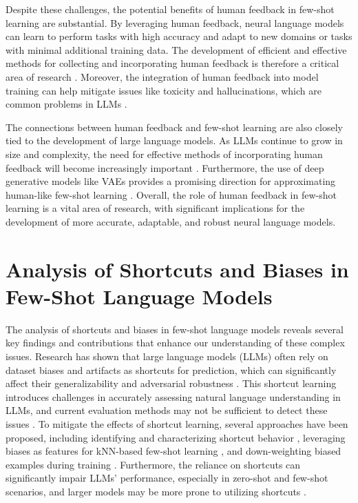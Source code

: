 \documentclass[conference]{IEEEtran}
\begin{document}
Despite these challenges, the potential benefits of human feedback in few-shot learning are substantial. By leveraging human feedback, neural language models can learn to perform tasks with high accuracy and adapt to new domains or tasks with minimal additional training data. The development of efficient and effective methods for collecting and incorporating human feedback is therefore a critical area of research \cite{b1, b2, b3}. Moreover, the integration of human feedback into model training can help mitigate issues like toxicity and hallucinations, which are common problems in LLMs \cite{b2, b5}.

The connections between human feedback and few-shot learning are also closely tied to the development of large language models. As LLMs continue to grow in size and complexity, the need for effective methods of incorporating human feedback will become increasingly important \cite{b1, b2, b5}. Furthermore, the use of deep generative models like VAEs provides a promising direction for approximating human-like few-shot learning \cite{b4}. Overall, the role of human feedback in few-shot learning is a vital area of research, with significant implications for the development of more accurate, adaptable, and robust neural language models.

\section{Analysis of Shortcuts and Biases in Few-Shot Language Models}
The analysis of shortcuts and biases in few-shot language models reveals several key findings and contributions that enhance our understanding of these complex issues. Research has shown that large language models (LLMs) often rely on dataset biases and artifacts as shortcuts for prediction, which can significantly affect their generalizability and adversarial robustness \cite{b1, b2, b4}. This shortcut learning introduces challenges in accurately assessing natural language understanding in LLMs, and current evaluation methods may not be sufficient to detect these issues \cite{b1, b3}. To mitigate the effects of shortcut learning, several approaches have been proposed, including identifying and characterizing shortcut behavior \cite{b2}, leveraging biases as features for kNN-based few-shot learning \cite{b3}, and down-weighting biased examples during training \cite{b5}. Furthermore, the reliance on shortcuts can significantly impair LLMs' performance, especially in zero-shot and few-shot scenarios, and larger models may be more prone to utilizing shortcuts \cite{b4}.
\end{document}
